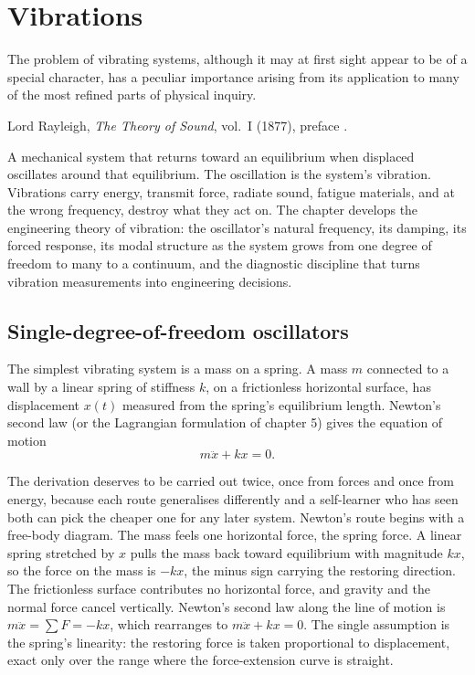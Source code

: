 \chapter{Vibrations}
\label{vol03:ch06}

\epigraph{The problem of vibrating systems, although it may at first
sight appear to be of a special character, has a peculiar importance
arising from its application to many of the most refined parts of
physical inquiry.}{Lord Rayleigh, \emph{The Theory of Sound}, vol.~I
(1877), preface \cite[p.~v]{hist:rayleigh1877}.}


\noindent
A mechanical system that returns toward an equilibrium when displaced
oscillates around that equilibrium. The oscillation is the system's
vibration. Vibrations carry energy, transmit force, radiate sound,
fatigue materials, and at the wrong frequency, destroy what they act
on. The chapter develops the engineering theory of vibration: the
oscillator's natural frequency, its damping, its forced response, its
modal structure as the system grows from one degree of freedom to
many to a continuum, and the diagnostic discipline that turns
vibration measurements into engineering decisions.

\section{Single-degree-of-freedom oscillators}

The simplest vibrating system is a mass on a spring. A mass $m$
connected to a wall by a linear spring of stiffness $k$, on a
frictionless horizontal surface, has displacement $x(t)$ measured
from the spring's equilibrium length. Newton's second law (or the
Lagrangian formulation of chapter 5) gives the equation of motion
\[
m\ddot{x} + kx = 0.
\]

The derivation deserves to be carried out twice, once from forces and
once from energy, because each route generalises differently and a
self-learner who has seen both can pick the cheaper one for any later
system. Newton's route begins with a free-body diagram. The mass feels
one horizontal force, the spring force. A linear spring stretched by
$x$ pulls the mass back toward equilibrium with magnitude $kx$, so the
force on the mass is $-kx$, the minus sign carrying the restoring
direction. The frictionless surface contributes no horizontal force,
and gravity and the normal force cancel vertically. Newton's second law
along the line of motion is $m\ddot{x} = \sum F = -kx$, which rearranges
to $m\ddot{x} + kx = 0$. The single assumption is the spring's
linearity: the restoring force is taken proportional to displacement,
exact only over the range where the force-extension curve is straight.

